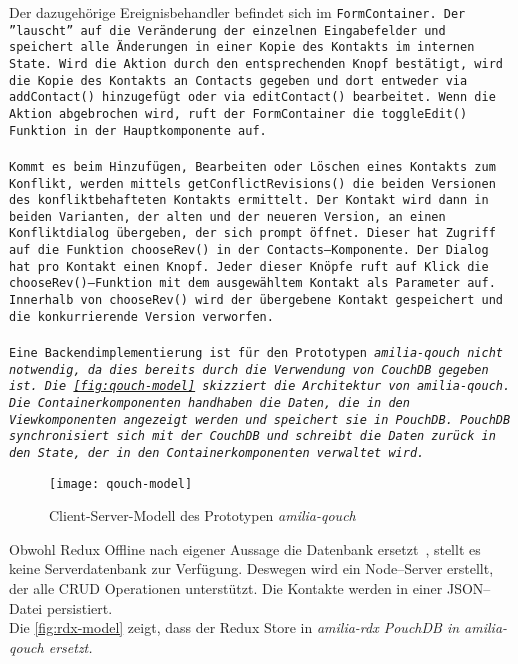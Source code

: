 Der dazugehörige Ereignisbehandler befindet sich im \tt{FormContainer}. 
Der ''lauscht'' auf die Veränderung der einzelnen Eingabefelder und speichert alle Änderungen in einer Kopie des Kontakts im internen State.
Wird die Aktion durch den entsprechenden Knopf bestätigt, wird die Kopie des Kontakts an \tt{Contacts} gegeben und dort entweder via \tt{addContact()} hinzugefügt oder via \tt{editContact()} bearbeitet.
Wenn die Aktion abgebrochen wird, ruft der \tt{FormContainer} die \tt{toggleEdit()} Funktion in der Hauptkomponente auf.\\\\
%
%
Kommt es beim Hinzufügen, Bearbeiten oder Löschen eines Kontakts zum Konflikt, werden mittels \tt{getConflictRevisions()} die beiden Versionen des konfliktbehafteten Kontakts ermittelt.
Der Kontakt wird dann in beiden Varianten, der alten und der neueren Version, an einen Konfliktdialog übergeben, der sich prompt öffnet.
Dieser hat Zugriff auf die Funktion \tt{chooseRev()} in der \tt{Contacts}--Komponente.
Der Dialog hat pro Kontakt einen Knopf. Jeder dieser Knöpfe ruft auf Klick die \tt{chooseRev()}--Funktion mit dem ausgewähltem Kontakt als Parameter auf.
Innerhalb von \tt{chooseRev()} wird der übergebene Kontakt gespeichert und die konkurrierende Version verworfen.\\\\
%
%
Eine Backendimplementierung ist für den Prototypen \it{amilia-qouch} nicht notwendig, da dies bereits durch die Verwendung von CouchDB gegeben ist.
Die \autoref{fig:qouch-model} skizziert die Architektur von \it{amilia-qouch}.
Die Containerkomponenten handhaben die Daten, die in den Viewkomponenten angezeigt werden und speichert sie in PouchDB.
PouchDB synchronisiert sich mit der CouchDB und schreibt die Daten zurück in den State, der in den Containerkomponenten verwaltet wird.
\begin{figure}[H]
  \centering
  \texttt{[image: qouch-model]}
  \grayRule
  \caption{Client-Server-Modell des Prototypen \it{amilia-qouch}}
  \label{fig:qouch-model}
\end{figure}
%
Obwohl Redux Offline nach eigener Aussage die Datenbank ersetzt~\cite{redux-offline}, stellt es keine Serverdatenbank zur Verfügung.
Deswegen wird ein Node--Server erstellt, der alle \gls{CRUD} Operationen unterstützt.
Die Kontakte werden in einer \gls{JSON}--Datei persistiert.\\
Die \autoref{fig:rdx-model} zeigt, dass der Redux Store in \it{amilia-rdx} PouchDB in \it{amilia-qouch} ersetzt.

